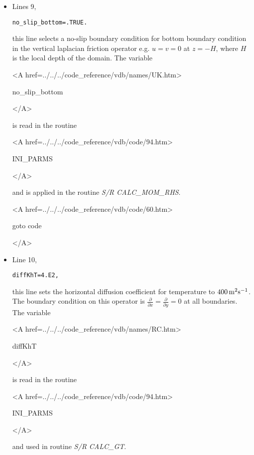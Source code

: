 \begin{itemize}
\item Lines 9,
\begin{verbatim}
no_slip_bottom=.TRUE.
\end{verbatim}
this line selects a no-slip boundary condition for bottom
boundary condition in the vertical laplacian friction operator 
e.g. $u=v=0$ at $z=-H$, where $H$ is the local depth of the domain.
The variable
{\bf
\begin{rawhtml} <A href=../../../code_reference/vdb/names/UK.htm> \end{rawhtml}
no\_slip\_bottom
\begin{rawhtml} </A>\end{rawhtml}
}
is read in the routine
{\it
\begin{rawhtml} <A href=../../../code_reference/vdb/code/94.htm> \end{rawhtml}
INI\_PARMS
\begin{rawhtml} </A>\end{rawhtml}
} and is applied in the routine {\it S/R CALC\_MOM\_RHS}.

{\bf
\begin{rawhtml} <A href=../../../code_reference/vdb/code/60.htm> \end{rawhtml}
goto code
\begin{rawhtml} </A>\end{rawhtml}
}

\item Line 10,
\begin{verbatim}
diffKhT=4.E2,
\end{verbatim}
this line sets the horizontal diffusion coefficient for temperature
to $400\,{\rm m^{2}s^{-1}}$. The boundary condition on this
operator is $\frac{\partial}{\partial x}=\frac{\partial}{\partial y}=0$ at
all boundaries.
The variable
{\bf
\begin{rawhtml} <A href=../../../code_reference/vdb/names/RC.htm> \end{rawhtml}
diffKhT
\begin{rawhtml} </A>\end{rawhtml}
}
is read in the routine
{\it
\begin{rawhtml} <A href=../../../code_reference/vdb/code/94.htm> \end{rawhtml}
INI\_PARMS
\begin{rawhtml} </A>\end{rawhtml}
} and used in routine {\it S/R CALC\_GT}.


\end{itemize}
